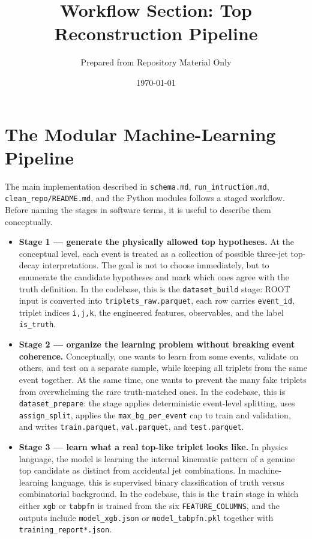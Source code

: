 \documentclass[11pt]{article}
\title{Workflow Section: Top Reconstruction Pipeline}
\author{Prepared from Repository Material Only}
\date{\today}
\begin{document}
\maketitle

\section{The Modular Machine-Learning Pipeline}

The main implementation described in \texttt{schema.md}, \texttt{run\_intruction.md}, \texttt{clean\_repo/README.md}, and the Python modules follows a staged workflow. Before naming the stages in software terms, it is useful to describe them conceptually.

\begin{itemize}[leftmargin=*]
  \item \textbf{Stage 1 --- generate the physically allowed top hypotheses.} At the conceptual level, each event is treated as a collection of possible three-jet top-decay interpretations. The goal is not to choose immediately, but to enumerate the candidate hypotheses and mark which ones agree with the truth definition. In the codebase, this is the \texttt{dataset\_build} stage: ROOT input is converted into \texttt{triplets\_raw.parquet}, each row carries \texttt{event\_id}, triplet indices \texttt{i,j,k}, the engineered features, observables, and the label \texttt{is\_truth}.
  \item \textbf{Stage 2 --- organize the learning problem without breaking event coherence.} Conceptually, one wants to learn from some events, validate on others, and test on a separate sample, while keeping all triplets from the same event together. At the same time, one wants to prevent the many fake triplets from overwhelming the rare truth-matched ones. In the codebase, this is \texttt{dataset\_prepare}: the stage applies deterministic event-level splitting, uses \texttt{assign\_split}, applies the \texttt{max\_bg\_per\_event} cap to train and validation, and writes \texttt{train.parquet}, \texttt{val.parquet}, and \texttt{test.parquet}.
  \item \textbf{Stage 3 --- learn what a real top-like triplet looks like.} In physics language, the model is learning the internal kinematic pattern of a genuine top candidate as distinct from accidental jet combinations. In machine-learning language, this is supervised binary classification of truth versus combinatorial background. In the codebase, this is the \texttt{train} stage in which either \texttt{xgb} or \texttt{tabpfn} is trained from the six \texttt{FEATURE\_COLUMNS}, and the outputs include \texttt{model\_xgb.json} or \texttt{model\_tabpfn.pkl} together with \texttt{training\_report*.json}.

\end{itemize}
\end{document}
